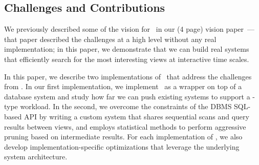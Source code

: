 \subsection*{Challenges and Contributions}
We previously described some of the vision for  \VizRecDB\ in our (4 page)
vision paper~\cite{DBLP:conf/vldb/Parameswaran2013}---that paper described the
challenges at a high level without any real implementation; in this paper, we
demonstrate that we can build real systems that efficiently search for the most
interesting views at interactive time scales.

In this paper, we describe two implementations of \VizRecDB\ that address the
challenges from \cite{DBLP:conf/vldb/Parameswaran2013}.
In our first implementation, we implement \VizRecDB\ as a wrapper on top of a
database system and study how far we can push existing systems to support a
\VizRecDB-type workload.
In the second, we overcome the constraints of the DBMS SQL-based API by writing a custom system
that  shares sequential scans and query results between views, and employs
statistical methods to perform aggressive pruning
based on intermediate results.
For each implementation of \VizRecDB, we also develop implementation-specific
optimizations that leverage the underlying system architecture.

